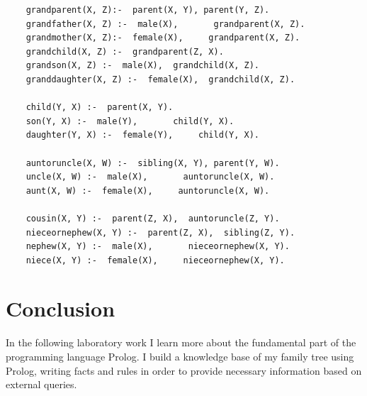 \documentclass[12pt]{article}
\begin{document}
  \newpage

  \begin{lstlisting}
    grandparent(X, Z):-  parent(X, Y), parent(Y, Z).
    grandfather(X, Z) :-  male(X),       grandparent(X, Z).
    grandmother(X, Z):-  female(X),     grandparent(X, Z).
    grandchild(X, Z) :-  grandparent(Z, X).
    grandson(X, Z) :-  male(X),  grandchild(X, Z).
    granddaughter(X, Z) :-  female(X),  grandchild(X, Z).

    child(Y, X) :-  parent(X, Y).
    son(Y, X) :-  male(Y),       child(Y, X).
    daughter(Y, X) :-  female(Y),     child(Y, X).

    auntoruncle(X, W) :-  sibling(X, Y), parent(Y, W).
    uncle(X, W) :-  male(X),       auntoruncle(X, W).
    aunt(X, W) :-  female(X),     auntoruncle(X, W).

    cousin(X, Y) :-  parent(Z, X),  auntoruncle(Z, Y).
    nieceornephew(X, Y) :-  parent(Z, X),  sibling(Z, Y).
    nephew(X, Y) :-  male(X),       nieceornephew(X, Y).
    niece(X, Y) :-  female(X),     nieceornephew(X, Y).
    \end{lstlisting}

    \section{Conclusion} %
    \label{sec:conclusion}

    In the following laboratory work I learn more about the fundamental part of
    the programming language Prolog. I build a knowledge base of my family tree using
    Prolog, writing facts and rules in order to provide necessary information based on external queries.


\end{document}
